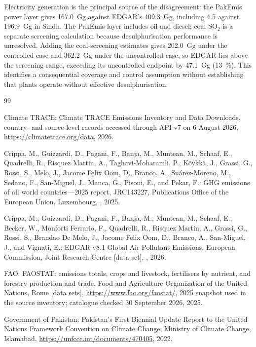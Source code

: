 \documentclass[essd,manuscript]{copernicus}
\begin{document}
Electricity generation is the principal source of the disagreement: the PakEmis power layer gives \SI{167.0}{\giga\gram} against EDGAR's \SI{409.3}{\giga\gram}, including \SI{4.5}{} against \SI{196.9}{\giga\gram} in Sindh. The PakEmis layer includes oil and diesel; coal SO$_2$ is a separate screening calculation because desulphurisation performance is unresolved. Adding the coal-screening estimates gives \SI{202.0}{\giga\gram} under the controlled case and \SI{362.2}{\giga\gram} under the uncontrolled case, so EDGAR lies above the screening range, exceeding its uncontrolled endpoint by \SI{47.1}{\giga\gram} (\SI{13}{\percent}). This identifies a consequential coverage and control assumption without establishing that plants operate without effective desulphurisation.

\begin{thebibliography}{99}

Climate TRACE: Climate TRACE Emissions Inventory and Data Downloads, country- and source-level records accessed through API v7 on 6 August 2026, \url{https://climatetrace.org/data}, 2026.

Crippa, M., Guizzardi, D., Pagani, F., Banja, M., Muntean, M., Schaaf, E., Quadrelli, R., Risquez Martin, A., Taghavi-Moharamli, P., K\"oykk\"a, J., Grassi, G., Rossi, S., Melo, J., Jacome Felix Oom, D., Branco, A., Su\'arez-Moreno, M., Sedano, F., San-Miguel, J., Manca, G., Pisoni, E., and Pekar, F.: GHG emissions of all world countries---2025 report, JRC143227, Publications Office of the European Union, Luxembourg, , 2025.

Crippa, M., Guizzardi, D., Pagani, F., Banja, M., Muntean, M., Schaaf, E., Becker, W., Monforti Ferrario, F., Quadrelli, R., Risquez Martin, A., Grassi, G., Rossi, S., Brandao De Melo, J., Jacome Felix Oom, D., Branco, A., San-Miguel, J., and Vignati, E.: EDGAR v8.1 Global Air Pollutant Emissions, European Commission, Joint Research Centre [data set], , 2026.

FAO: FAOSTAT: emissions totals, crops and livestock, fertilisers by nutrient, and forestry production and trade, Food and Agriculture Organization of the United Nations, Rome [data sets], \url{https://www.fao.org/faostat/}, 2025 snapshot used in the source inventory; catalogue checked 30 September 2026, 2025.

Government of Pakistan: Pakistan's First Biennial Update Report to the United Nations Framework Convention on Climate Change, Ministry of Climate Change, Islamabad, \url{https://unfccc.int/documents/470405}, 2022.


\end{thebibliography}
\end{document}
